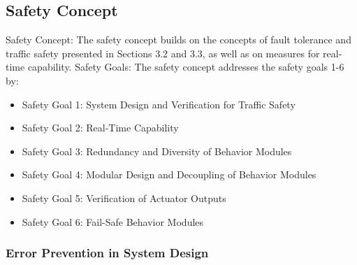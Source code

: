 \subsection{Safety Concept}

Safety Concept: The safety concept builds on the concepts of fault tolerance and traffic safety presented in Sections 3.2 and 3.3, as well as on measures for real-time capability.
Safety Goals: The safety concept addresses the safety goals 1-6 by:

\begin{itemize}
    \item Safety Goal 1: System Design and Verification for Traffic Safety
    \item Safety Goal 2: Real-Time Capability
    \item Safety Goal 3: Redundancy and Diversity of Behavior Modules
    \item Safety Goal 4: Modular Design and Decoupling of Behavior Modules
    \item Safety Goal 5: Verification of Actuator Outputs
    \item Safety Goal 6: Fail-Safe Behavior Modules
\end{itemize}

\subsubsection*{Error Prevention in System Design}

